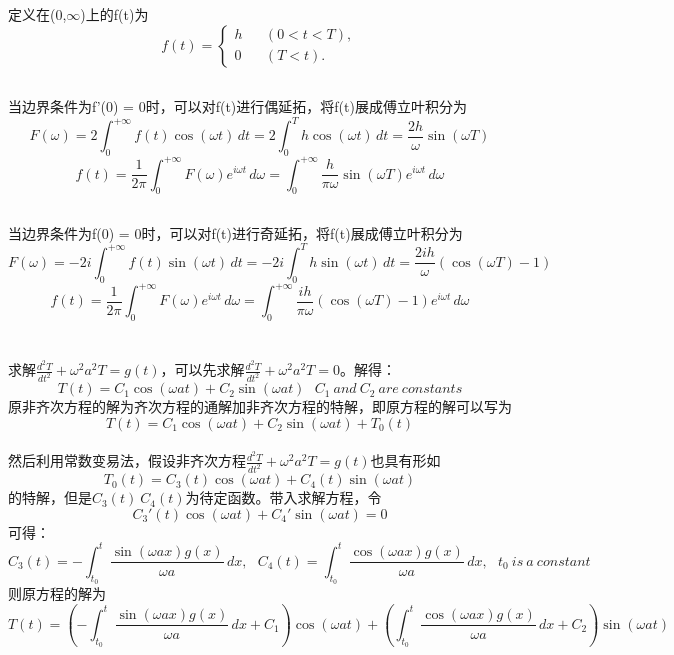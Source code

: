 \documentclass[10.5pt]{article}
\begin{document}
\section{}
定义在(0,$\infty$)上的f(t)为$$f(t) = \left\{
\begin{array}{rcl}
    h & & (0<t<T),\\
    0 & & (T<t).
\end{array}\right.$$
\subsection{}
当边界条件为f'(0) = 0时，可以对f(t)进行偶延拓，将f(t)展成傅立叶积分为$$F(\omega) = 2\int_{0}^{+\infty} f(t)\cos(\omega t) \,dt = 2\int_0^T h\cos(\omega t) \,dt = \frac{2h}{\omega}\sin(\omega T)$$ $$f(t) = \frac{1}{2\pi}\int_{0}^{+\infty} F(\omega) e^{i\omega t} \,d\omega = \int_{0}^{+\infty} \frac{h}{\pi\omega}\sin(\omega T) e^{i\omega t} \,d\omega$$
\subsection{}
当边界条件为f(0) = 0时，可以对f(t)进行奇延拓，将f(t)展成傅立叶积分为$$F(\omega) = -2i\int_{0}^{+\infty} f(t)\sin(\omega t) \,dt = -2i\int_0^T h\sin(\omega t) \,dt = \frac{2ih}{\omega}\left(\cos(\omega T) - 1\right)$$ $$f(t) = \frac{1}{2\pi} \int_{0}^{+\infty} F(\omega) e^{i\omega t} \,d\omega = \int_{0}^{+\infty} \frac{ih}{\pi\omega} \left(\cos(\omega T)-1\right) e^{i\omega t} \,d\omega$$

\section{}
求解$\frac{d^2 T}{d t^2} + \omega^2a^2T = g(t) $，可以先求解$\frac{d^2 T}{d t^2} + \omega^2a^2T = 0 $。解得：$$T(t) = C_1 \cos(\omega at) +C_2\sin(\omega at)~~~ C_1 ~and ~C_2 ~are ~constants$$\indent
原非齐次方程的解为齐次方程的通解加非齐次方程的特解，即原方程的解可以写为$$T(t) = C_1 \cos(\omega at) +C_2\sin(\omega at) + T_0(t)$$\\\indent
然后利用常数变易法，假设非齐次方程$\frac{d^2 T}{d t^2} + \omega^2a^2T = g(t) $也具有形如$$T_0(t) = C_3(t) \cos(\omega at) +C_4(t) \sin(\omega at)$$的特解，但是$C_3(t)~C_4(t)$为待定函数。带入求解方程，令$$C_3'(t)\cos(\omega at) + C_4'\sin(\omega at) = 0$$\indent
可得：$$C_3(t) = -\int_{t_0}^{t} \frac{\sin(\omega ax)g(x)}{\omega a} \,dx,~~~C_4(t) = \int_{t_0}^{t} \frac{\cos(\omega ax)g(x)}{\omega a} \,dx,~~~t_0 ~is ~a ~constant$$
则原方程的解为$$T(t) = \left(-\int_{t_0}^{t} \frac{\sin(\omega ax)g(x)}{\omega a} \,dx + C_1\right)\cos(\omega at) + \left(\int_{t_0}^{t} \frac{\cos(\omega ax)g(x)}{\omega a} \,dx + C_2\right)\sin(\omega at)$$
\end{document}
